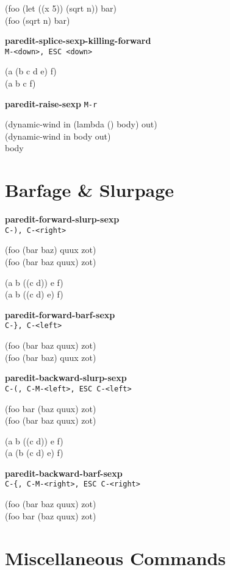 \documentclass[10pt,landscape,a4paper]{article}
\begin{document}
\begin{multicols}{4}
{\ttfamily
(foo (let ((x 5)) \cursor(sqrt n)) bar)\\
(foo \cursor(sqrt n) bar)
}

\textbf{paredit-splice-sexp-killing-forward} \\\texttt{M-<down>, ESC <down>}

{\ttfamily
(a (b c\cursor{} d e) f)\\
(a b c\cursor{} f)
}

\textbf{paredit-raise-sexp} \texttt{M-r}

{\ttfamily
(dynamic-wind in (lambda () \cursor body) out)\\
(dynamic-wind in \cursor body out)\\
\cursor body
}

    \section*{\large{Barfage \& Slurpage}}

\textbf{paredit-forward-slurp-sexp} \\\texttt{C-), C-<right>}

{\ttfamily
(foo (bar \cursor baz) quux zot)\\
(foo (bar \cursor baz quux) zot)

(a b ((c\cursor{} d)) e f)\\
(a b ((c\cursor{} d) e) f)
}

\textbf{paredit-forward-barf-sexp} \\\texttt{C-\}, C-<left>}

{\ttfamily
(foo (bar \cursor baz quux) zot)\\
(foo (bar \cursor baz) quux zot)
}

\textbf{paredit-backward-slurp-sexp} \\\texttt{C-(, C-M-<left>, ESC C-<left>}

{\ttfamily
(foo bar (baz\cursor{} quux) zot)\\
(foo (bar\cursor{} baz quux) zot)

(a b ((c\cursor{} d)) e f)\\
(a (b (c\cursor{} d) e) f)
}

\textbf{paredit-backward-barf-sexp} \\\texttt{C-\{, C-M-<right>, ESC C-<right>}

{\ttfamily
(foo (bar baz \cursor quux) zot)\\
(foo bar (baz \cursor quux) zot)
}

    \section*{\large{Miscellaneous Commands}}


\end{multicols}
\end{document}
